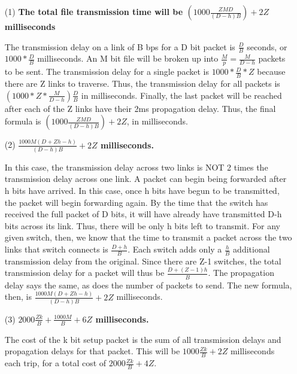 \documentclass[11pt]{article}
\begin{document}
\begin{itemize}
\item[(1)] \textbf{The total file transmission time will be $(1000\frac{ZMD}{(D-h)B}) + 2Z$ milliseconds}

The transmission delay on a link of B bps for a D bit packet is $\frac{D}{B}$ seconds, or $1000*\frac{D}{B}$ milliseconds. An M bit file will be broken up into $\frac{M}{p}=\frac{M}{D-h}$ packets to be sent. The transmission delay for a single packet is $1000*\frac{D}{B}*Z$ because there are Z links to traverse. Thus, the transmission delay for all packets is $(1000*Z*\frac{M}{D-h})\frac{D}{B}$ in milliseconds. Finally, the last packet will be reached after each of the Z links have their 2ms propagation delay. Thus, the final formula is $(1000\frac{ZMD}{(D-h)B}) + 2Z$, in milliseconds.
\item[(2)] \textbf{$\frac{1000M(D+Zh-h)}{(D-h)B}+2Z$ milliseconds.}

In this case, the transmission delay across two links is NOT 2 times the transmission delay across one link. A packet can begin being forwarded after h bits have arrived. In this case, once h bits have begun to be transmitted, the packet will begin forwarding again. By the time that the switch has received the full packet of D bits, it will have already have transmitted D-h bits across its link. Thus, there will be only h bits left to transmit. For any given switch, then, we know that the time to transmit a packet across the two links that switch connects is $\frac{D + h}{B}$. Each switch adds only a $\frac{h}{B}$ additional transmission delay from the original. Since there are Z-1 switches, the total transmission delay for a packet will thus be $\frac{D + (Z-1)h}{B}$. The propagation delay says the same, as does the number of packets to send. The new formula, then, is $\frac{1000M(D+Zh-h)}{(D-h)B}+2Z$ milliseconds.
\item[(3)] \textbf{$2000\frac{Zk}{B} + \frac{1000M}{B} + 6Z$ milliseconds.}

The cost of the k bit setup packet is the sum of all transmission delays and propagation delays for that packet. This will be $1000\frac{Zk}{B} + 2Z$ milliseconds each trip, for a total cost of $2000\frac{Zk}{B} + 4Z$.


\end{itemize}
\end{document}
